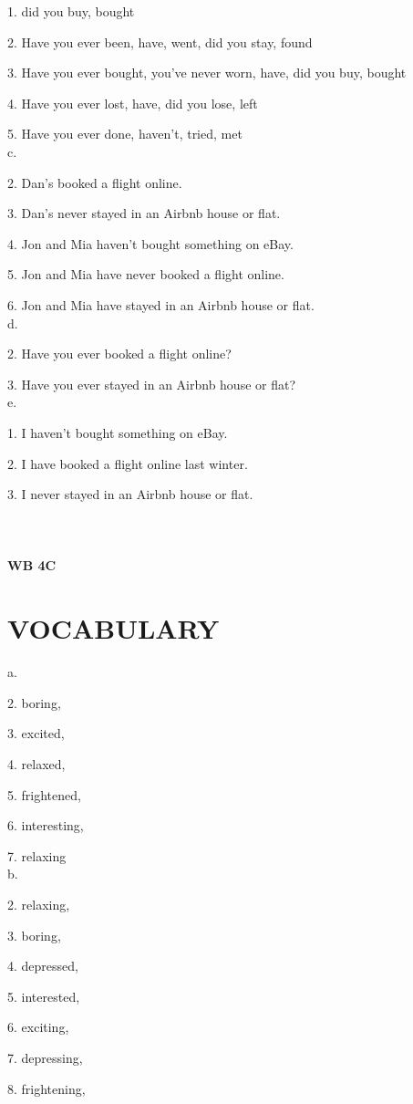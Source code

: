 \documentclass{article}
\begin{document}
1. did you buy, bought


2. Have you ever been, have, went, did you stay, found


3. Have you ever bought, you've never worn, have, did you buy, bought


4. Have you ever lost, have, did you lose, left


5. Have you ever done, haven't, tried,
met
\\
c. 

2. Dan's booked a flight online.


3. Dan's never stayed in an Airbnb house or flat.


4. Jon and Mia haven't bought something on eBay.


5. Jon and Mia have never booked a flight online.


6. Jon and Mia have stayed in an Airbnb house or flat.
\\
d. 

2. Have you ever booked a flight
online?


3. Have you ever stayed in an Airbnb house or flat?
\\
e.

1. I haven't bought something on eBay.

2. I have booked a flight online last winter.

3. I never stayed in an Airbnb house or flat.
\\ \\
\\ \\

\textbf{WB 4C}
\section*{VOCABULARY}
a. 

2. boring, 

3. excited, 

4. relaxed,

5. frightened, 

6. interesting, 

7. relaxing 
\\
b. 

2. relaxing, 

3. boring, 

4. depressed, 

5. interested, 

6. exciting, 

7. depressing, 

8. frightening, 
\end{document}
